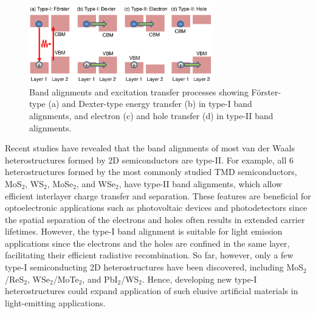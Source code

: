 \documentclass[10pt]{iopart}
\begin{document}
\begin{figure}[ht]
    \centering
    \includegraphics[width=8cm]{alignment.pdf}
    \caption{Band alignments and excitation transfer processes showing F{\"{o}}rster-type (a) and Dexter-type energy transfer (b) in type-I band alignments, and electron (c) and hole transfer (d) in type-II band alignments.}
    \label{fig:alignment}
\end{figure}

Recent studies have revealed that the band alignments of most van der Waals heterostructures formed by 2D semiconductors are type-II. For example, all 6 heterostructures formed by the most commonly studied TMD semiconductors, MoS$_2$, WS$_2$, MoSe$_2$, and WSe$_2$, have type-II band alignments\cite{hong2014ultrafast,ceballos2014ultrafast,bellus2015tightly,fang2014strong,gong2015two,kumar2018interlayer},  which allow efficient interlayer charge transfer and separation. These features are beneficial for optoelectronic applications such as photovoltaic devices and photodetectors since the spatial separation of the electrons and holes often results in extended carrier lifetimes. However, the type-I band alignment is suitable for light emission applications since the electrons and the holes are confined in the same layer, facilitating their efficient radiative recombination. So far, however, only a few type-I semiconducting 2D heterostructures have been discovered, including MoS$_2$/ReS$_2$\cite{bellus2017type},  WSe$_2$/MoTe$_2$\cite{li2018type,bae2021light},  and PbI$_2$/WS$_2$\cite{zheng2019probing}.  Hence, developing new type-I heterostructures could expand application of such elusive artificial materials in light-emitting applications.
\end{document}
